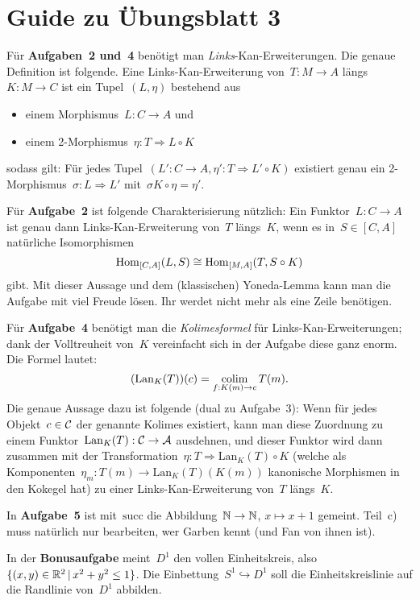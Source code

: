 \documentclass{uebblatt}
\begin{document}
\section*{Guide zu Übungsblatt 3}

Für \textbf{Aufgaben~2 und~4} benötigt man \emph{Links}-Kan-Erweiterungen. Die genaue
Definition ist folgende. Eine Links-Kan-Erweiterung von~$T : M \to A$ längs~$K
: M \to C$ ist ein Tupel~$(L,\eta)$ bestehend aus
\begin{itemize}
\item einem Morphismus~$L : C \to A$ und
\item einem 2-Morphismus~$\eta : T \Rightarrow L \circ K$
\end{itemize}
sodass gilt:
Für jedes Tupel~$(L' : C \to A,\eta' : T \Rightarrow L' \circ K)$ existiert
genau ein 2-Morphismus~$\sigma : L \Rightarrow L'$ mit~$
\sigma K \circ \eta = \eta'$.

Für \textbf{Aufgabe~2} ist folgende Charakterisierung nützlich: Ein Funktor~$L : C \to
A$ ist genau dann Links-Kan-Erweiterung von~$T$ längs~$K$, wenn es in~$S \in
[C,A]$ natürliche Isomorphismen
\[ \mathrm{Hom}_{[C,A]}(L, S) \cong \mathrm{Hom}_{[M,A]}(T, S \circ K) \]
gibt. Mit dieser Aussage und dem (klassischen) Yoneda-Lemma kann man
die Aufgabe mit viel Freude lösen. Ihr werdet nicht mehr als eine Zeile
benötigen.

Für \textbf{Aufgabe~4} benötigt man die \emph{Kolimesformel} für
Links-Kan-Erweiterungen; dank der Volltreuheit von~$K$ vereinfacht sich in der
Aufgabe diese ganz enorm. Die Formel lautet:
\[ (\mathrm{Lan}_K(T))(c) = \operatorname*{colim}_{f:K(m) \to c} T(m). \]
Die genaue Aussage dazu ist folgende (dual zu Aufgabe~3): Wenn für jedes
Objekt~$c \in \mathcal{C}$ der genannte Kolimes existiert, kann man diese Zuordnung zu
einem Funktor~$\mathrm{Lan}_K(T) : \mathcal{C} \to \mathcal{A}$ ausdehnen, und dieser Funktor
wird dann zusammen mit der Transformation~$\eta : T \Rightarrow \mathrm{Lan}_K(T)
\circ K$ (welche als Komponenten~$\eta_m : T(m) \to \mathrm{Lan}_K(T)(K(m))$
kanonische Morphismen in den Kokegel hat) zu einer Links-Kan-Erweiterung
von~$T$ längs~$K$.

In \textbf{Aufgabe~5} ist mit~$\mathrm{succ}$ die Abbildung~$\mathbb{N} \to \mathbb{N}$, $x \mapsto x
+ 1$ gemeint. Teil~c) muss natürlich nur bearbeiten, wer Garben kennt (und Fan
von ihnen ist).

In der \textbf{Bonusaufgabe} meint~$D^1$ den vollen Einheitskreis, also~$\{ (x,y) \in
\mathbb{R}^2 \,|\, x^2 + y^2 \leq 1 \}$. Die Einbettung~$S^1 \hookrightarrow D^1$ soll
die Einheitskreislinie auf die Randlinie von~$D^1$ abbilden.
\end{document}
